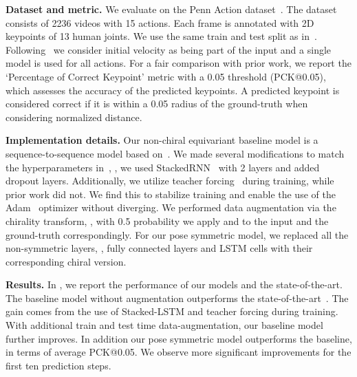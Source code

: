 \documentclass{article}
\begin{document}
\textbf{Dataset and metric.}
We evaluate on the Penn Action dataset~\cite{zhang2013actemes}. The dataset consists of  2236 videos with 15 actions. Each frame is annotated with 2D keypoints of 13 human joints. We use the same train and test split as in~\cite{chao2017forecasting, chiu2019action}. Following~\citet{chiu2019action} we consider initial velocity as being part of the input and a single model is used for all actions. 
For a fair comparison with prior work, we report  the `Percentage of Correct Keypoint' metric with a 0.05 threshold (PCK@0.05), which assesses the accuracy of the predicted keypoints. A predicted keypoint is considered correct if it is within a 0.05 radius of the ground-truth when considering normalized distance.

\textbf{Implementation details.} Our non-chiral equivariant baseline model is a sequence-to-sequence model based on~\cite{martinez2017human}. We made several modifications to match the hyperparameters in~\cite{chiu2019action}, \ie, we used StackedRNN~\cite{pascanu2014howto} with 2 layers and added dropout layers. Additionally, we utilize teacher forcing~\cite{williams1989learning} during training, while prior work did not. We find this to stabilize training and enable the use of the Adam~\cite{kingma2015adam, ams_grad} optimizer without diverging. We performed data augmentation via the chirality transform, \ie, with 0.5 probability we apply  and  to the input and the ground-truth correspondingly.
For our pose symmetric model, we replaced all the non-symmetric layers, \eg, fully connected layers and LSTM cells with their corresponding
chiral version.


\textbf{Results.}
In , we report the performance of our models and the state-of-the-art. The baseline model without augmentation outperforms the state-of-the-art~\cite{chiu2019action}. The gain comes from the use of Stacked-LSTM and teacher forcing during training. With  additional  train and test time data-augmentation, our baseline model further improves. In addition our pose symmetric model outperforms the baseline, in terms of average PCK@0.05. We observe more significant improvements for the first ten prediction steps. 
\end{document}
